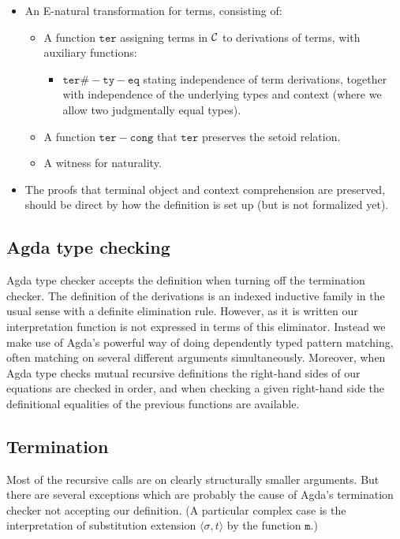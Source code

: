 \documentclass{amsart}
\theoremstyle{plain}
\theoremstyle{definition}
\theoremstyle{remark}
\begin{document}
\begin{itemize}
\item An E-natural transformation for terms, consisting of:
  \begin{itemize}
  \item A function $\mathtt{ter}$ assigning terms in $\mathcal{C}$ to
    derivations of terms, with auxiliary functions:
    \begin{itemize}
    \item $\mathtt{ter\#-ty-eq}$ stating independence of term
      derivations, together with independence of the underlying types
      and context (where we allow two judgmentally equal types).
    \end{itemize}
  \item A function $\mathtt{ter-cong}$ that $\mathtt{ter}$ preserves
    the setoid relation.
  \item A witness for naturality.
  \end{itemize}

\item The proofs that terminal object and context comprehension are
  preserved, should be direct by how the definition is set up (but is
  not formalized yet).
\end{itemize}


\subsection{Agda type checking}

Agda type checker accepts the definition when turning off the
termination checker.  The definition of the derivations is an indexed
inductive family in the usual sense with a definite elimination rule.
However, as it is written our interpretation function is not expressed
in terms of this eliminator.  Instead we make use of Agda's powerful
way of doing dependently typed pattern matching, often matching on
several different arguments simultaneously.  Moreover, when Agda type
checks mutual recursive definitions the right-hand sides of our
equations are checked in order, and when checking a given right-hand
side the definitional equalities of the previous functions are
available.


\subsection{Termination}

Most of the recursive calls are on clearly structurally smaller
arguments.  But there are several exceptions which are probably the
cause of Agda's termination checker not accepting our definition.  (A
particular complex case is the interpretation of substitution
extension $\langle \sigma, t \rangle$ by the function $\mathtt{m}$.)
\end{document}
